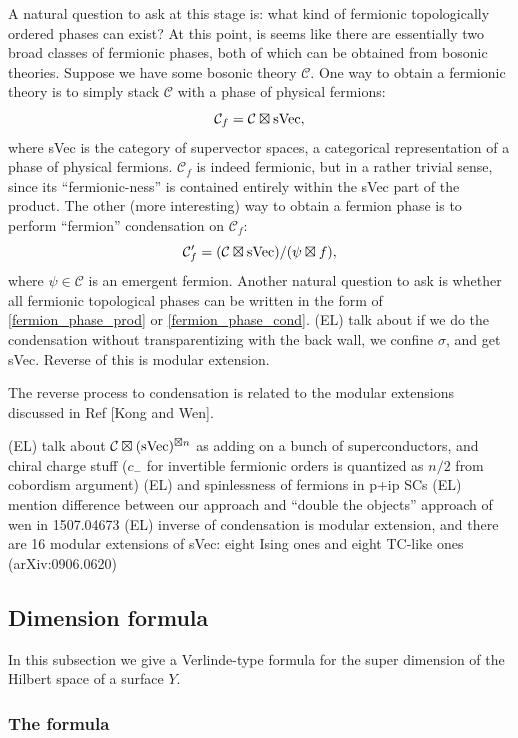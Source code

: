 \documentclass[12pt,a4paper]{article}
\newcommand{\mcc}{\mathcal{C}}
\newcommand\be            {\begin{equation}}
\newcommand\ee            {\end{equation}}
\newcommand{\ethan}[1]{{\color{amethyst}\footnotesize{(EL) #1}}}
\begin{document}
A natural question to ask at this stage is: what kind of fermionic topologically ordered phases can exist? At this point, is seems like there are essentially two broad classes of fermionic phases, both of which can be obtained from bosonic theories. Suppose we have some bosonic theory $\mcc$. One way to obtain a fermionic theory is to simply stack $\mcc$ with a phase of physical fermions:
\be \label{fermion_phase_prod} \mcc_f = \mcc \boxtimes {\rm sVec}, \ee
where sVec is the category of supervector spaces, a categorical representation of a phase of physical fermions. $\mcc_f$ is indeed fermionic, but in a rather trivial sense, since its ``fermionic-ness'' is contained entirely within the sVec part of the product. The other (more interesting) way to obtain a fermion phase is to perform ``fermion'' condensation on $\mcc_f$:
\be \label{fermion_phase_cond} \mcc_f' = (\mcc \boxtimes {\rm sVec}) / (\psi \boxtimes f),\ee
where $\psi \in \mcc$ is an emergent fermion. 
Another natural question to ask is whether all fermionic topological phases can be written in the form of \eqref{fermion_phase_prod} or \eqref{fermion_phase_cond}. 
\ethan{talk about if we do the condensation without transparentizing with the back wall, we confine $\sigma$, and get sVec. Reverse of this is modular extension.}

The reverse process to condensation is related to the modular extensions discussed in Ref [Kong and Wen]. 

\ethan{talk about $\mcc \boxtimes ({\rm sVec})^{\boxtimes n}$ as adding on a bunch of superconductors, and chiral charge stuff ($c_-$ for invertible fermionic orders is quantized as $n/2$ from cobordism argument)} 
\ethan{and spinlessness of fermions in p+ip SCs}
\ethan{mention difference between our approach and ``double the objects'' approach of wen in 1507.04673}
\ethan{inverse of condensation is modular extension, and there are 16 modular extensions of sVec: eight Ising ones and eight TC-like ones (arXiv:0906.0620)}



\subsection{Dimension formula}

In this subsection we give a Verlinde-type formula for the super dimension of the Hilbert space of a surface $Y$.


\subsubsection{The formula}
\end{document}

